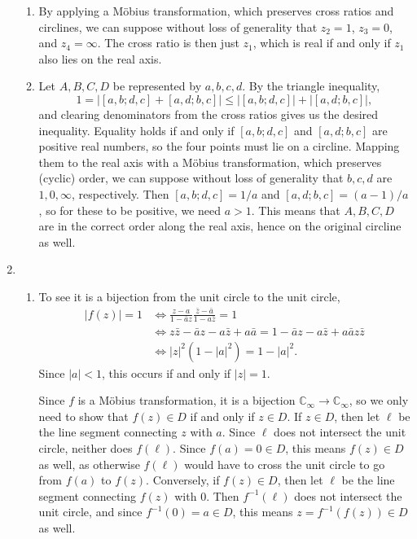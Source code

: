 \begin{enumerate}
\begin{enumerate}
\item By applying a M\"{o}bius transformation, which preserves cross ratios and circlines, we can suppose without loss of generality that $z_2 = 1$, $z_3 = 0$, and $z_4 = \infty$. The cross ratio is then just $z_1$, which is real if and only if $z_1$ also lies on the real axis.
\item Let $A,B,C,D$ be represented by $a,b,c,d$. By the triangle inequality,
\begin{equation*}
1 = \lvert [a,b;d,c] + [a,d;b,c]\rvert\leq\lvert [a,b;d,c]\rvert + \lvert [a,d;b,c]\rvert,
\end{equation*}
and clearing denominators from the cross ratios gives us the desired inequality. Equality holds if and only if $[a,b;d,c]$ and $[a,d;b,c]$ are positive real numbers, so the four points must lie on a circline. Mapping them to the real axis with a M\"{o}bius transformation, which preserves (cyclic) order, we can suppose without loss of generality that $b,c,d$ are $1,0,\infty$, respectively. Then $[a,b;d,c] = 1/a$ and $[a,d;b,c] = (a - 1)/a$, so for these to be positive, we need $a > 1$. This means that $A,B,C,D$ are in the correct order along the real axis, hence on the original circline as well.
\end{enumerate}
\item \begin{enumerate}
\item To see it is a bijection from the unit circle to the unit circle,
\begin{align*}
\lvert f(z)\rvert = 1 &\iff \frac{z - a}{1 - \bar{a}z}\frac{\bar{z} - \bar{a}}{1 - a\bar{z}} = 1 \\
&\iff z\bar{z} - \bar{a}z - a\bar{z} + a\bar{a} = 1 - \bar{a}z - a\bar{z} + a\bar{a}z\bar{z} \\
&\iff \lvert z\rvert^2(1 - \lvert a\rvert^2) = 1 - \lvert a\rvert^2.
\end{align*}
Since $\lvert a\rvert < 1$, this occurs if and only if $\lvert z\rvert = 1$.\par
Since $f$ is a M\"{o}bius transformation, it is a bijection $\mathbb{C}_{\infty}\to\mathbb{C}_{\infty}$, so we only need to show that $f(z)\in D$ if and only if $z\in D$. If $z\in D$, then let $\ell$ be the line segment connecting $z$ with $a$. Since $\ell$ does not intersect the unit circle, neither does $f(\ell)$. Since $f(a) = 0\in D$, this means $f(z)\in D$ as well, as otherwise $f(\ell)$ would have to cross the unit circle to go from $f(a)$ to $f(z)$. Conversely, if $f(z)\in D$, then let $\ell$ be the line segment connecting $f(z)$ with $0$. Then $f^{-1}(\ell)$ does not intersect the unit circle, and since $f^{-1}(0) = a\in D$, this means $z = f^{-1}(f(z))\in D$ as well.

\end{enumerate}
\end{enumerate}
